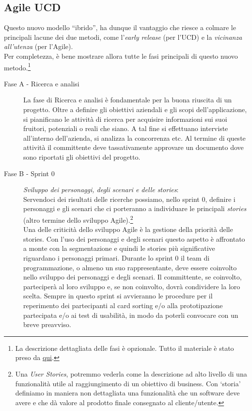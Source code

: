 \documentclass[oneside]{book}
\begin{document}
		\subsection{Agile UCD} 
			Questo nuovo modello ``ibrido'', ha dunque il vantaggio che riesce a colmare le principali lacune dei due metodi, come l'\emph{early release} (per l'UCD) e la \emph{vicinanza all'utenza} (per l'Agile). \\
			Per completezza, è bene mostrare allora tutte le fasi principali di questo nuovo metodo.\footnote{La descrizione dettagliata delle fasi è opzionale. Tutto il materiale è stato preso da \href{http://www.progettareperlepersone.it/dblog/articolo.asp?articolo=104}{qui}.}
			\begin{description}
			\item[Fase A - Ricerca e analisi] La fase di Ricerca e analisi è fondamentale per la buona riuscita di un progetto. Oltre a definire gli obiettivi aziendali e gli scopi dell'applicazione, si pianificano le attività di ricerca per acquisire informazioni sui suoi fruitori, potenziali o reali che siano. A tal fine si effettuano interviste all’interno dell’azienda, si analizza la concorrenza etc. Al termine di queste attività il committente deve tassativamente approvare un documento dove sono riportati gli obiettivi del progetto. 

			\item[Fase B - Sprint 0] \emph{Sviluppo dei personaggi, degli scenari e delle stories}: \\
			Servendoci dei risultati delle ricerche possiamo, nello sprint 0, definire i personaggi e gli scenari che ci porteranno a individuare le principali \emph{stories} (altro termine dello sviluppo Agile).\footnote{ Una \emph{User Stories}, potremmo vederla come la descrizione ad alto livello di una funzionalità utile al raggiungimento di un obiettivo di business. Con ‘storia’ definiamo in maniera non dettagliata una funzionalità che un software deve avere e che dà valore al prodotto finale consegnato al cliente/utente.}  \\

			Una delle criticità dello sviluppo Agile è la gestione della priorità delle stories. Con l’uso dei personaggi e degli scenari questo aspetto è affrontato a monte con la segmentazione e quindi le stories più significative riguardano i personaggi primari. Durante lo sprint 0 il team di programmazione, o almeno un suo rappresentante, deve essere coinvolto nello sviluppo dei personaggi e degli scenari. Il committente, se coinvolto, parteciperà al loro sviluppo e, se non coinvolto, dovrà condividere la loro scelta. Sempre in questo sprint si avvieranno le procedure per il reperimento dei partecipanti al card sorting e/o alla prototipazione partecipata e/o ai test di usabilità, in modo da poterli convocare con un breve preavviso. 


\end{description}
\end{document}
